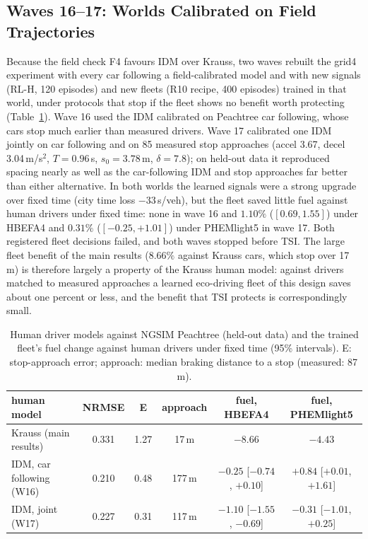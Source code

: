 \subsection{Waves 16--17: Worlds Calibrated on Field Trajectories}\label{sec:w16}
Because the field check F4 favours IDM over Krauss, two waves rebuilt the grid4 experiment with every car following a field-calibrated
model and with new signals (RL-H, 120 episodes) and new fleets (R10 recipe, 400 episodes) trained in that world, under protocols that stop if
the fleet shows no benefit worth protecting (Table~\ref{tab:human}). Wave 16 used the IDM calibrated on Peachtree car following, whose cars
stop much earlier than measured drivers. Wave 17 calibrated one IDM jointly on car following and on 85 measured stop approaches (accel
3.67, decel 3.04\,m/s$^2$, $T=0.96$\,s, $s_0=3.78$\,m, $\delta=7.8$); on held-out data it reproduced spacing nearly as well as the car-following
IDM and stop approaches far better than either alternative. In both worlds the learned signals were a strong upgrade over fixed time (city
time loss $-33$\,s/veh), but the fleet saved little fuel against human drivers under fixed time: none in wave 16 and $1.10\%$ ($[0.69, 1.55]$)
under HBEFA4 and $0.31\%$ ($[-0.25, +1.01]$) under PHEMlight5 in wave 17. Both registered fleet decisions failed, and both waves stopped before
TSI. The large fleet benefit of the main results ($8.66\%$ against Krauss cars, which stop over 17\,m) is therefore largely a property of the
Krauss human model: against drivers matched to measured approaches a learned eco-driving fleet of this design saves about one percent or less,
and the benefit that TSI protects is correspondingly small.
\begin{table}[t]\centering\scriptsize\setlength{\tabcolsep}{4pt}
\caption{Human driver models against NGSIM Peachtree (held-out data) and the trained fleet's fuel change against human drivers under fixed
time (95\% intervals). E: stop-approach error; approach: median braking distance to a stop (measured: 87\,m).}\label{tab:human}
\begin{tabular}{@{}lccccc@{}}\toprule
human model & NRMSE & E & approach & fuel, HBEFA4 & fuel, PHEMlight5\\\midrule
Krauss (main results) & 0.331 & 1.27 & 17\,m & $-8.66$ & $-4.43$\\
IDM, car following (W16) & 0.210 & 0.48 & 177\,m & $-0.25$ [$-0.74$, $+0.10$] & $+0.84$ [$+0.01$, $+1.61$]\\
IDM, joint (W17) & 0.227 & 0.31 & 117\,m & $-1.10$ [$-1.55$, $-0.69$] & $-0.31$ [$-1.01$, $+0.25$]\\\bottomrule
\end{tabular}\end{table}

